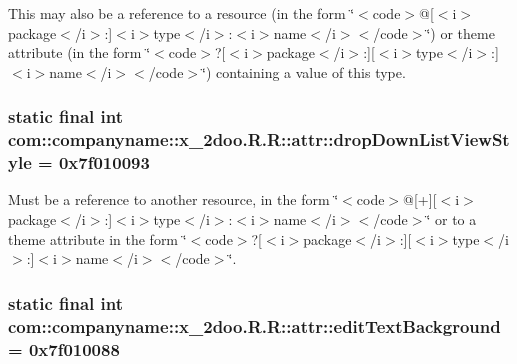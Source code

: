 This may also be a reference to a resource (in the form \char`\"{}$<$code$>$@\mbox{[}$<$i$>$package$<$/i$>$:\mbox{]}$<$i$>$type$<$/i$>$:$<$i$>$name$<$/i$>$$<$/code$>$\char`\"{}) or theme attribute (in the form \char`\"{}$<$code$>$?\mbox{[}$<$i$>$package$<$/i$>$:\mbox{]}\mbox{[}$<$i$>$type$<$/i$>$:\mbox{]}$<$i$>$name$<$/i$>$$<$/code$>$\char`\"{}) containing a value of this type. \hypertarget{classcom_1_1companyname_1_1x__2doo_1_1_r_1_1attr_4af8075c171aece6c5ba9ce03299d157}{
\subsubsection[{dropDownListViewStyle}]{\setlength{\rightskip}{0pt plus 5cm}static final int com::companyname::x\_\-2doo.R.R::attr::dropDownListViewStyle = 0x7f010093}}
\label{classcom_1_1companyname_1_1x__2doo_1_1_r_1_1attr_4af8075c171aece6c5ba9ce03299d157}


Must be a reference to another resource, in the form \char`\"{}$<$code$>$@\mbox{[}+\mbox{]}\mbox{[}$<$i$>$package$<$/i$>$:\mbox{]}$<$i$>$type$<$/i$>$:$<$i$>$name$<$/i$>$$<$/code$>$\char`\"{} or to a theme attribute in the form \char`\"{}$<$code$>$?\mbox{[}$<$i$>$package$<$/i$>$:\mbox{]}\mbox{[}$<$i$>$type$<$/i$>$:\mbox{]}$<$i$>$name$<$/i$>$$<$/code$>$\char`\"{}. \hypertarget{classcom_1_1companyname_1_1x__2doo_1_1_r_1_1attr_e2d21d60b2bbbf43bf225a9ece0f684f}{
\subsubsection[{editTextBackground}]{\setlength{\rightskip}{0pt plus 5cm}static final int com::companyname::x\_\-2doo.R.R::attr::editTextBackground = 0x7f010088}}
\label{classcom_1_1companyname_1_1x__2doo_1_1_r_1_1attr_e2d21d60b2bbbf43bf225a9ece0f684f}


